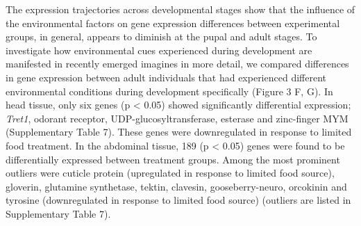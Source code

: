 \documentclass[lineno]{wiley-article}
\begin{document}
The expression trajectories across developmental stages show that the influence of the environmental factors on gene expression differences between experimental groups, in general, appears to diminish at the pupal and adult stages. To investigate how environmental cues experienced during development are manifested in recently emerged imagines in more detail, we compared differences in gene expression between adult individuals that had experienced different environmental conditions during development specifically (Figure 3 F, G). In head tissue, only six genes (p < 0.05) showed significantly differential expression; \textit{Tret1}, odorant receptor, UDP-glucosyltransferase, esterase and zinc-finger MYM (Supplementary Table 7). These genes were downregulated in response to limited food treatment. In the abdominal tissue, 189 (p < 0.05) genes were found to be differentially expressed between treatment groups. Among the most prominent outliers were cuticle protein (upregulated in response to limited food source), gloverin, glutamine synthetase, tektin, clavesin, gooseberry-neuro, orcokinin and tyrosine (downregulated in response to limited food source) (outliers are listed in Supplementary Table 7). 
\end{document}
